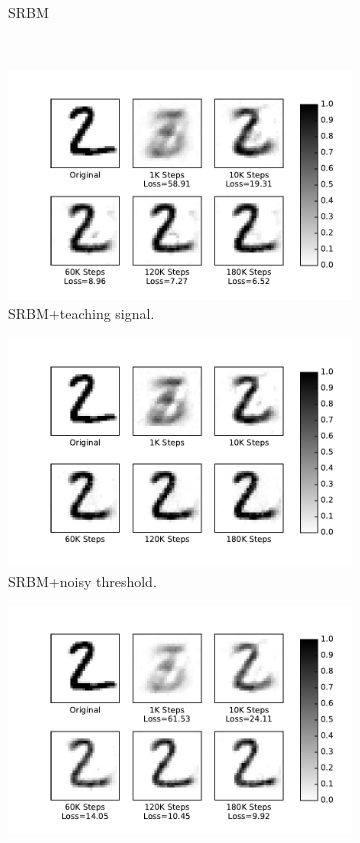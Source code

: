 \begin{figure}
\begin{subfigure}[t]{0.32\textwidth}
		\caption{SRBM}
	\end{subfigure}\\
	\begin{subfigure}[t]{0.32\textwidth}
		\includegraphics[width=\textwidth]{pics_sdlm/51_MNIST_SRBM_teach/recon_digit.pdf}
		\caption{SRBM+teaching signal.}
	\end{subfigure}
	\begin{subfigure}[t]{0.32\textwidth}
		\includegraphics[width=\textwidth]{pics_sdlm/noise_rbm/recon_digit.pdf}
		\caption{SRBM+noisy threshold.}
	\end{subfigure}
	\begin{subfigure}[t]{0.32\textwidth}
		\includegraphics[width=\textwidth]{pics_sdlm/53_MNIST_SRBM_all/recon_digit.pdf}

\end{subfigure}
\end{figure}
